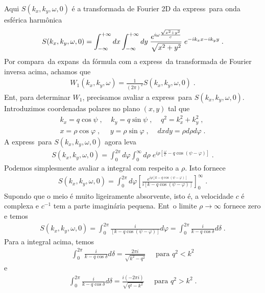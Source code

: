 Aqui $S(k_x,k_y,\omega,0)$ \'e a transformada de Fourier 2D da
express\ao\ para onda esf\'erica harm\^onica
\begin{eqnarray}
S(k_x,k_y,\omega,0) = \int_{-\infty}^{+\infty} dx \int_{-\infty}^{+\infty} dy \; \frac{e^{i\omega
\frac{\sqrt{x^2+y^2}}{c}}}{\sqrt{x^2+y^2}} \; e^{-ik_x x - ik_y y} \; .
\end{eqnarray}
Por compara\cao\ da expans\ao\ da f\'ormula com a express\ao\ da
transformada de Fourier inversa acima, achamos que
\begin{eqnarray}
W_1(k_x,k_y,\omega) = \frac{1}{(2\pi)^2} S(k_x,k_y,\omega,0) \; .
\end{eqnarray}
Ent\ao, para determinar $W_1$, precisamos avaliar a express\ao\
para $S(k_x,k_y,\omega,0)$. Introduzimos coordenadas polares no
plano $(x, y)$ tal que
\begin{eqnarray}
k_x = q \cos\psi \; , \;\;\;\;  k_y = q \sin\psi \; , \;\;\;\; q^2=k_x^2+k_y^2 \; ,\\
x = \rho \cos\varphi \; , \;\;\;\;\ y = \rho \sin\varphi \; , \;\;\;\; dxdy =
\rho d\rho d\varphi \; .
\end{eqnarray}
A express\ao\ para $S(k_x,k_y,\omega,0)$ agora leva
\begin{eqnarray}
S(k_x,k_y,\omega,0) = \int_0^{2\pi} d\varphi \int_0^{\infty} d\rho \;
e^{i\rho\left[\frac{\omega}{c}-q\cos(\psi-\varphi) \right]} \; . 
\end{eqnarray}
Podemos simplesmente avaliar a integral com respeito a $\rho$. Isto
fornece
\begin{eqnarray}
S(k_x,k_y,\omega,0) = \int_0^{2\pi} d\varphi \left[ \frac{e^{i\rho
\left[k-q\cos(\psi-\varphi) \right]}}{i[k-q\cos(\psi-\varphi)]}\right]_0^{\infty}
\; . 
\end{eqnarray}
Supondo que o meio \'e muito ligeiramente absorvente, isto \'e, a
velocidade $c$ \'e complexa e $c^{-1}$ tem a parte imagin\'aria pequena.
Ent\ao\ o limite $\rho \rightarrow \infty$ fornece zero e temos
\begin{eqnarray}
S(k_x,k_y,\omega,0) = \int_0^{2\pi} \frac{i}{[k-q\cos(\psi-\varphi)]} d\varphi
= \int_0^{2\pi} \frac{i}{k-q\cos\delta} d\delta \; . 
\end{eqnarray}
Para a integral acima, temos
\begin{eqnarray}
\int_0^{2\pi} \frac{i}{k-q\cos\delta} d\delta = \frac{2\pi i}{\sqrt{k^2-q^2}}
\;\;\;\;\; \mbox{para } q^2 < k^2 
\end{eqnarray}
e
\begin{eqnarray}
\int_0^{2\pi} \frac{i}{k-q\cos\delta} d\delta = \frac{i(-2\pi i)}{\sqrt{q^2-k^2}}
\;\;\;\;\; \mbox{para } q^2 > k^2 \; . 
\end{eqnarray}
